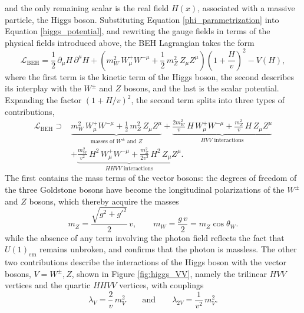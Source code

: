 %
and the only remaining scalar is the real field $H(x)$, associated with a massive particle, the Higgs boson. Substituting Equation \ref{phi_parametrization} into Equation \ref{higgs_potential}, and rewriting the gauge fields in terms of the physical fields introduced above, the BEH Lagrangian takes the form
\begin{equation}
    \mathcal{L}_{\text{BEH}} = \frac{1}{2}\,\partial_\mu H\,\partial^\mu H
    + \left(m_W^2\, W^+_\mu W^{-\mu} + \frac{1}{2}\, m_Z^2\, Z_\mu Z^\mu\right)\left(1+\frac{H}{v}\right)^{2} - V(H),
    \label{eq:beh}
\end{equation}
%
where the first term is the kinetic term of the Higgs boson, the second describes its interplay with the $W^\pm$ and $Z$ bosons, and the last is the scalar potential. Expanding the factor $(1+H/v)^2$, the second term splits into three types of contributions,
\begin{equation}
    \begin{split}
    \mathcal{L}_{\text{BEH}} \supset {}&
    \underbrace{m_W^2\, W^+_\mu W^{-\mu} + \frac{1}{2}\, m_Z^2\, Z_\mu Z^\mu}_{\text{masses of } W^\pm \text{ and } Z}
    + \underbrace{\frac{2m_W^2}{v}\, H\, W^+_\mu W^{-\mu} + \frac{m_Z^2}{v}\, H\, Z_\mu Z^\mu}_{HVV \text{ interactions}} \\[4pt]
    & + \underbrace{\frac{m_W^2}{v^2}\, H^2\, W^+_\mu W^{-\mu} + \frac{m_Z^2}{2v^2}\, H^2\, Z_\mu Z^\mu}_{HHVV \text{ interactions}}.
    \end{split}
    \label{eq:beh_gauge}
\end{equation}
%
The first contains the mass terms of the vector bosons: the degrees of freedom of the three Goldstone bosons have become the longitudinal polarizations of the $W^\pm$ and $Z$ bosons, which thereby acquire the masses
%
\begin{equation}
    m_Z = \frac{\sqrt{g^2+g'^2}}{2}\,v, \qquad m_W = \frac{g\,v}{2} = m_Z\cos\theta_W.
    \label{eq:boson_masses}
\end{equation}
%
while the absence of any term involving the photon field reflects the fact that $U(1)_{\text{em}}$ remains unbroken, and confirms that the photon is massless. The other two contributions describe the interactions of the Higgs boson with the vector bosons, $V=W^\pm, Z$, shown in Figure \ref{fig:higgs_VV}, namely the trilinear $HVV$ vertices and the quartic $HHVV$ vertices, with couplings
\begin{equation}
    \lambda_{V} = \frac{2}{v}\, m_{V}^{2} \qquad\text{and}\qquad \lambda_{2V} = \frac{1}{v^{2}}\, m_{V}^{2}.
\end{equation}
